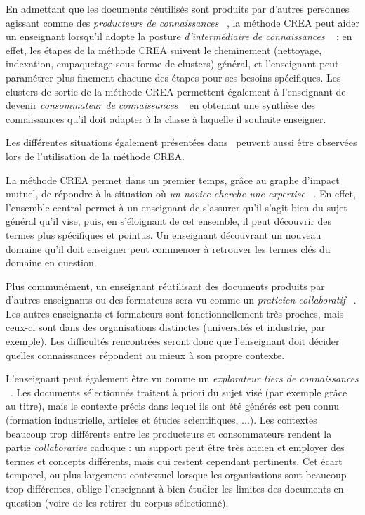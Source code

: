 En admettant que les documents réutilisés sont produits par d'autres personnes agissant comme des \og \textit{producteurs de connaissances} \fg~\cite{markus2001toward}, la méthode CREA peut aider un enseignant lorsqu'il adopte la posture \og \textit{d'intermédiaire de connaissances} \fg~\cite{markus2001toward} : en effet, les étapes de la méthode CREA suivent le cheminement (nettoyage, indexation, empaquetage sous forme de clusters) général, et l'enseignant peut paramétrer plus finement chacune des étapes pour ses besoins spécifiques.
Les clusters de sortie de la méthode CREA permettent également à l'enseignant de devenir \og \textit{consommateur de connaissances} \fg~\cite{markus2001toward} en obtenant une synthèse des connaissances qu'il doit adapter à la classe à laquelle il souhaite enseigner.

\bigskip

Les différentes situations également présentées dans~\cite{markus2001toward} peuvent aussi être observées lors de l'utilisation de la méthode CREA.

La méthode CREA permet dans un premier temps, grâce au graphe d'impact mutuel, de répondre à la situation où \og \textit{un novice cherche une expertise} \fg~\cite{markus2001toward}.
En effet, l'ensemble central permet à un enseignant de s'assurer qu'il s'agit bien du sujet général qu'il vise, puis, en s'éloignant de cet ensemble, il peut découvrir des termes plus spécifiques et pointus.
Un enseignant découvrant un nouveau domaine qu'il doit enseigner peut commencer à retrouver les termes clés du domaine en question.

Plus communément, un enseignant réutilisant des documents produits par d'autres enseignants ou des formateurs sera vu comme un \og \textit{praticien collaboratif} \fg~\cite{markus2001toward}.
Les autres enseignants et formateurs sont fonctionnellement très proches, mais ceux-ci sont dans des organisations distinctes (universités et industrie, par exemple).
Les difficultés rencontrées seront donc que l'enseignant doit décider quelles connaissances répondent au mieux à son propre contexte.

L'enseignant peut également être vu comme un \og \textit{explorateur tiers de connaissances} \fg~\cite{markus2001toward}.
Les documents sélectionnés traitent à priori du sujet visé (par exemple grâce au titre), mais le contexte précis dans lequel ils ont été générés est peu connu (formation industrielle, articles et études scientifiques, ...).
Les contextes beaucoup trop différents entre les producteurs et consommateurs rendent la partie \textit{collaborative} caduque : un support peut être très ancien et employer des termes et concepts différents, mais qui restent cependant pertinents.
Cet écart temporel, ou plus largement contextuel lorsque les organisations sont beaucoup trop différentes, oblige l'enseignant à bien étudier les limites des documents en question (voire de les retirer du corpus sélectionné).


